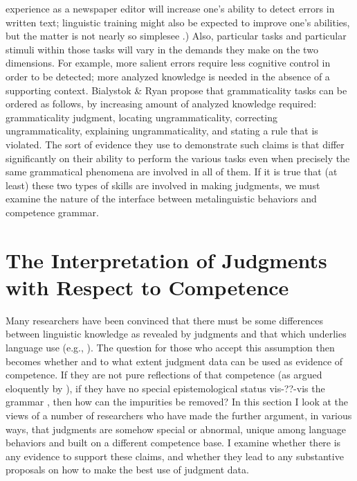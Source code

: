  experience as a newspaper editor will increase one's ability to detect errors in written text; linguistic training might also be expected to improve one's abilities, but the matter is not nearly so simple\schdash{}see .) Also, particular tasks and particular stimuli within those tasks will vary in the demands they make on the two dimensions. For example, more salient errors require less cognitive control in order to be detected; more analyzed knowledge is needed in the absence of a supporting context. Bialystok \& Ryan propose that grammaticality tasks can be ordered as follows, by increasing amount of analyzed knowledge required: grammaticality judgment, locating ungrammaticality, correcting ungrammaticality, explaining ungrammaticality, and stating a rule that is violated. The sort of evidence they use to demonstrate such claims is that  differ significantly on their ability to perform the various tasks even when precisely the same grammatical phenomena are involved in all of them. If it is true that (at least) these two types of skills are involved in making judgments, we must examine the nature of the interface between metalinguistic behaviors and competence grammar.


\section{The Interpretation of Judgments with Respect to Competence}\label{sec:3.5}

Many researchers have been convinced that there must be some differences between linguistic knowledge as revealed by judgments and that which underlies language use (e.g., \citet{CardenEtAl1981}). The question for those who accept this assumption then becomes whether and to what extent judgment data can be used as evidence of competence. If they are not pure reflections of that competence (as argued eloquently by \citet[vol. 3: 5\textendash{}7]{Levelt1974}), if they have no special epistemological status vis-??-vis the grammar \citep{LeveltEtAl1978}, then how can the impurities be removed? In this section I look at the views of a number of researchers who have made the further argument, in various ways, that judgments are somehow special or abnormal, unique among language behaviors and built on a different competence base. I examine whether there is any evidence to support these claims, and whether they lead to any substantive proposals on how to make the best use of judgment data.

